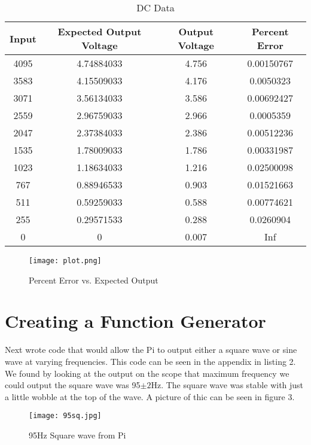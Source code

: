 \documentclass[prl,12pt,notitlepage,aps,onecolumn,superscriptaddress]{revtex4-1}
\begin{document}
\begin{table}[htbp]
 \centering
 \caption{DC Data}
   \begin{tabular}{c|c|c|c}
   \toprule
   Input & Expected Output Voltage & Output Voltage & Percent Error \\
   \midrule
   4095  & 4.74884033 & 4.756 & 0.00150767 \\
   3583  & 4.15509033 & 4.176 & 0.0050323 \\
   3071  & 3.56134033 & 3.586 & 0.00692427 \\
   2559  & 2.96759033 & 2.966 & 0.0005359 \\
   2047  & 2.37384033 & 2.386 & 0.00512236 \\
   1535  & 1.78009033 & 1.786 & 0.00331987 \\
   1023  & 1.18634033 & 1.216 & 0.02500098 \\
   767   & 0.88946533 & 0.903 & 0.01521663 \\
   511   & 0.59259033 & 0.588 & 0.00774621 \\
   255   & 0.29571533 & 0.288 & 0.0260904 \\
   0     & 0     & 0.007 & Inf \\
   \bottomrule
   \end{tabular}%
 \label{tab:addlabel}%
\end{table}%


\begin{figure}[h]
\begin{center}
\texttt{[image: plot.png]}
\end{center}
\caption{\label{fig:pic} Percent Error vs. Expected Output}
\end{figure}

\section{Creating a Function Generator}
Next wrote code that would allow the Pi to output either a square wave or sine wave at varying frequencies. This code can be seen in the appendix in listing 2. We found by looking at the output on the scope that maximum frequency we could output the square wave was 95$\pm2$Hz. The square wave was stable with just a little wobble at the top of the wave. A picture of thic can be seen in figure 3.

\begin{figure}[h]
\begin{center}
\texttt{[image: 95sq.jpg]}
\end{center}
\caption{\label{fig:pic} 95Hz Square wave from Pi}
\end{figure}
\end{document}
